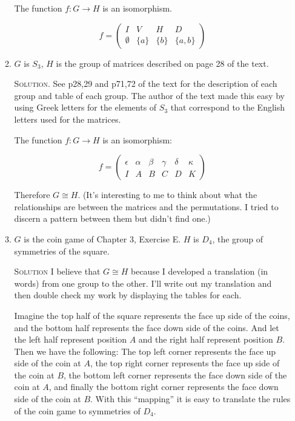 \documentclass[twoside]{amsart}
\newcommand{\solution}{\textsc{Solution}\xspace}
\newcommand{\iso}{\cong}
\newcommand{\blank}{\vspace{5pt}}
\begin{document}
\begin{enumerate}[A.]
\begin{enumerate}[1]
      The function $f : G \to H$ is an isomorphism.

      \begin{center}
      \[
         f = \begin{pmatrix}
               I & V & H & D \\
               \emptyset & \{a\} & \{b\} & \{a,b\}
             \end{pmatrix}
      \]
      \end{center}

      \item $G$ is $S_3$, $H$ is the group of matrices described on page 28
      of the text.

      \blank \noindent \solution. See p28,29 and p71,72 of the text for the
      description of each group and table of each group. The author of the
      text made this easy by using Greek letters for the elements of
      $S_3$ that correspond to the English letters used for the matrices.

      The function $f : G \to H$ is an isomorphism:

      \begin{center}
      \[
         f =   \begin{pmatrix}
                  \epsilon & \alpha & \beta & \gamma & \delta & \kappa \\
                  I        & A      & B     & C      & D      & K
               \end{pmatrix}
      \]
      \end{center}

      Therefore $G \iso H$. (It's interesting to me to think about what
      the relationships are between the matrices and the permutations.
      I tried to discern a pattern between them but didn't find one.)

      \blank
      \item $G$ is the coin game of Chapter 3, Exercise E. $H$ is $D_4$,
      the group of symmetries of the square.

      \blank \noindent \solution I believe that $G \iso H$ because I
      developed a translation (in words) from one group to the other.
      I'll write out my translation and then double check my work
      by displaying the tables for each.

      Imagine the top half of the square represents the face up side
      of the coins, and the bottom half represents the face down side
      of the coins. And let the left half represent position $A$ and
      the right half represent position $B$. Then we have the following:
      The top left corner represents the face up side of the coin at $A$, the
      top right corner represents the face up side of the coin at $B$,
      the bottom left corner represents the face down side of the coin at $A$,
      and finally the bottom right corner represents the face down side
      of the coin at $B$. With this ``mapping'' it is easy to translate
      the rules of the coin game to symmetries of $D_4$.


\end{enumerate}
\end{enumerate}
\end{document}
